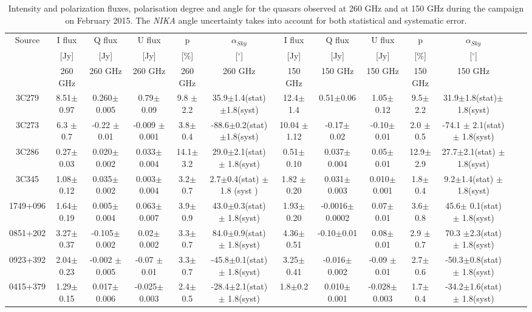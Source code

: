 \documentclass[twocolumn,traditabstract]{aa}
\begin{document}
 
  
  
\landscape
\begin{table}

\begin{center}
\begin{tabular}{ccccccccccccc}
\hline
\hline
Source & I flux & Q flux &  U flux  & p & $\alpha_{Sky}$ & I flux & Q flux &  U flux  & p & $\alpha_{Sky}$ \\
            & [Jy] & [Jy] & [Jy] & [\%] & [$^\circ$] & [Jy] & [Jy] & [Jy] & [\%] & [$^\circ$] \\
            & 260 GHz & 260 GHz & 260 GHz & 260 GHz & 260 GHz & 150 GHz & 150 GHz & 150 GHz & 150 GHz & 150 GHz\\
\hline
3C279 &  8.51$\pm$0.97 &  0.260$\pm$0.005 & 0.79$\pm$0.09 & 9.8 $\pm$ 2.2 & 35.9$\pm$1.4(stat) $\pm$1.8(syst) &  12.4$\pm$1.4 &  0.51$\pm$0.06 &  1.05$\pm$0.12 &  9.5$\pm$2.2 & 31.9$\pm$1.8(stat)$\pm$1.8(syst) \\
3C273 &  6.3 $\pm$0.7 & -0.22 $\pm$ 0.01 & -0.009 $\pm$0.001 &  3.8$\pm$0.4 & -88.6$\pm$0.2(stat)$\pm$1.8(syst) & 10.04 $\pm$1.12 & -0.17$\pm$ 0.02 & -0.10$\pm$ 0.01 &  2.0 $\pm$ 0.5 & -74.1 $\pm$ 2.1(stat) $\pm$ 1.8(syst) \\
3C286 &  0.27$\pm$0.03 & 0.020$\pm$0.002 & 0.033$\pm$0.004 & 14.1$\pm$3.2 & 29.0$\pm$2.1(stat) $\pm$ 1.8(syst) & 0.51$\pm$0.10 & 0.037$\pm$0.004 & 0.05$\pm$0.01 & 12.9$\pm$2.9 &  27.7$\pm$2.1(stat) $\pm$ 1.8(syst) \\
3C345 &  1.08$\pm$0.12 & 0.035$\pm$0.002 & 0.003$\pm$ 0.004 & 3.2$\pm$ 0.7 & 2.7$\pm$0.4(stat) $\pm$ 1.8 (syst )&  1.82 $\pm$ 0.20 & 0.031$\pm$0.003 & 0.010$\pm$0.001 & 1.8$\pm$0.4 &  9.2$\pm$1.4(stat) $\pm$ 1.8(syst) \\
1749+096 & 1.64$\pm$0.19 & 0.005$\pm$0.004 & 0.063$\pm$0.007 &  3.9$\pm$0.9 & 43.0$\pm$0.3(stat) $\pm$ 1.8(syst) & 1.93$\pm$0.20 & -0.0016$\pm$0.0002 & 0.07$\pm$0.01 & 3.6$\pm$0.8 & 45.6$\pm$ 0.1(stat) $\pm$ 1.8(syst)  \\
0851+202 & 3.27$\pm$0.37 & -0.105$\pm$0.002 &  0.02$\pm$0.002 & 3.3$\pm$0.7 & 84.0$\pm$0.9(stat) $\pm$ 1.8(syst) &  4.36$\pm$0.51 & -0.10$\pm$0.01 & 0.08$\pm$0.01 & 2.9 $\pm$ 0.7 & 70.3 $\pm$2.3(stat) $\pm$ 1.8(syst)  \\
0923+392 & 2.04$\pm$0.23 & -0.002 $\pm$0.005 & -0.07 $\pm$ 0.01 & 3.3$\pm$0.7 & -45.8$\pm$0.1(stat) $\pm$ 1.8(syst) & 3.25$\pm$0.41 & -0.016$\pm$0.002 &  -0.09 $\pm$ 0.01 & 2.7$\pm$0.6 & -50.3$\pm$0.8(stat) $\pm$ 1.8(syst)  \\
0415+379 & 1.29$\pm$0.15 & 0.017$\pm$0.006 & -0.025$\pm$0.003 & 2.4$\pm$0.5 &  -28.4$\pm$2.1(stat) $\pm$ 1.8(syst) & 1.8$\pm$0.2 & 0.010$\pm$0.001 & -0.028$\pm$0.003 & 1.7$\pm$0.4 & -34.2$\pm$1.6(stat) $\pm$ 1.8(syst)\\
\hline
\end{tabular}
\caption{ Intensity and polarization fluxes, polarisation degree and angle for the quasars observed at 260 GHz and at 150 GHz during the campaign on February 2015. The {\it NIKA} angle uncertainty takes into account for both statistical and systematic error.}
\label{tab:table_quasar}
\end{center}



\end{table}
\end{document}
